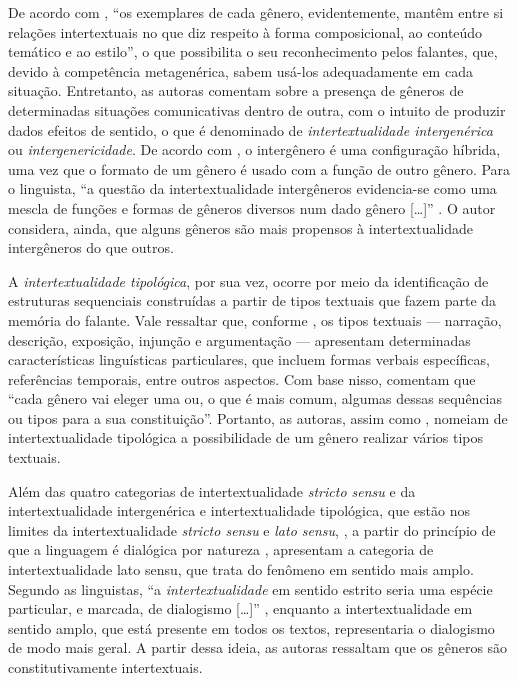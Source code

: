 \documentclass{textolivre}
\begin{document}
De acordo com \textcite[p. 63]{koch_intertextualidade:_2012}, “os exemplares de cada gênero, evidentemente, mantêm entre si relações intertextuais no que diz respeito à forma composicional, ao conteúdo temático e ao estilo”, o que possibilita o seu reconhecimento pelos falantes, que, devido à competência metagenérica, sabem usá-los adequadamente em cada situação. Entretanto, as autoras comentam sobre a presença de gêneros de determinadas situações comunicativas dentro de outra, com o intuito de produzir dados efeitos de sentido, o que é denominado de \textit{intertextualidade intergenérica} ou \textit{intergenericidade}. De acordo com \textcite{marcuschi_generos_2010}, o intergênero é uma configuração híbrida, uma vez que o formato de um gênero é usado com a função de outro gênero. Para o linguista, “a questão da intertextualidade intergêneros evidencia-se como uma mescla de funções e formas de gêneros diversos num dado gênero […]” \cite[p. 33]{marcuschi_generos_2010}. O autor considera, ainda, que alguns gêneros são mais propensos à intertextualidade intergêneros do que outros.

A \textit{intertextualidade tipológica}, por sua vez, ocorre por meio da identificação de estruturas sequenciais construídas a partir de tipos textuais que fazem parte da memória do falante. Vale ressaltar que, conforme \textcite{marcuschi_generos_2010}, os tipos textuais — narração, descrição, exposição, injunção e argumentação — apresentam determinadas características linguísticas particulares, que incluem formas verbais específicas, referências temporais, entre outros aspectos. Com base nisso, \textcite[p. 77]{koch_intertextualidade:_2012} comentam que “cada gênero vai eleger uma ou, o que é mais comum, algumas dessas sequências ou tipos para a sua constituição”. Portanto, as autoras, assim como \textcite{marcuschi_generos_2010}, nomeiam de intertextualidade tipológica a possibilidade de um gênero realizar vários tipos textuais.

Além das quatro categorias de intertextualidade \textit{stricto sensu} e da intertextualidade intergenérica e intertextualidade tipológica, que estão nos limites da intertextualidade \textit{stricto sensu} e \textit{lato sensu}, \textcite{koch_intertextualidade:_2012}, a partir do princípio de que a linguagem é dialógica por natureza \cite{bakhtin_os_2011}, apresentam a categoria de intertextualidade lato sensu, que trata do fenômeno em sentido mais amplo. Segundo as linguistas, “a \textit{intertextualidade} em sentido estrito seria uma espécie particular, e marcada, de dialogismo […]” \cite[p. 127, grifo das autoras]{koch_intertextualidade:_2012}, enquanto a intertextualidade em sentido amplo, que está presente em todos os textos, representaria o dialogismo de modo mais geral. A partir dessa ideia, as autoras ressaltam que os gêneros são constitutivamente intertextuais.
\end{document}

